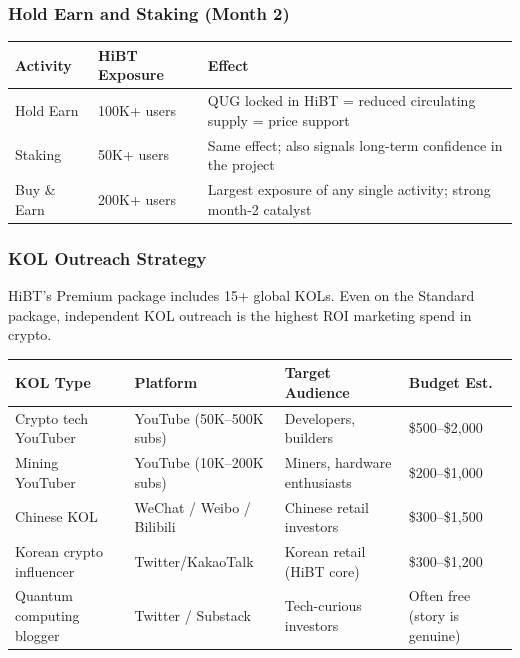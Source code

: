 \documentclass[11pt,a4paper]{article}
\begin{document}
\subsubsection{Hold Earn and Staking (Month 2)}

\begin{center}
\begin{tabular}{L{4cm} L{4cm} L{5cm}}
  \toprule
  \textbf{Activity} & \textbf{HiBT Exposure} & \textbf{Effect} \\
  \midrule
  Hold Earn & 100K+ users & QUG locked in HiBT = reduced circulating supply = price support \\
  Staking & 50K+ users & Same effect; also signals long-term confidence in the project \\
  Buy \& Earn & 200K+ users & Largest exposure of any single activity; strong month-2 catalyst \\
  \bottomrule
\end{tabular}
\end{center}

\subsubsection{KOL Outreach Strategy}

HiBT's Premium package includes 15+ global KOLs. Even on the Standard package, independent KOL outreach is the highest ROI marketing spend in crypto.

\begin{center}
\begin{tabular}{L{3cm} L{4cm} L{3.5cm} L{2.5cm}}
  \toprule
  \textbf{KOL Type} & \textbf{Platform} & \textbf{Target Audience} & \textbf{Budget Est.} \\
  \midrule
  Crypto tech YouTuber & YouTube (50K--500K subs) & Developers, builders & \$500--\$2,000 \\
  Mining YouTuber & YouTube (10K--200K subs) & Miners, hardware enthusiasts & \$200--\$1,000 \\
  Chinese KOL & WeChat / Weibo / Bilibili & Chinese retail investors & \$300--\$1,500 \\
  Korean crypto influencer & Twitter/KakaoTalk & Korean retail (HiBT core) & \$300--\$1,200 \\
  Quantum computing blogger & Twitter / Substack & Tech-curious investors & Often free (story is genuine) \\
  \bottomrule
\end{tabular}
\end{center}
\end{document}
